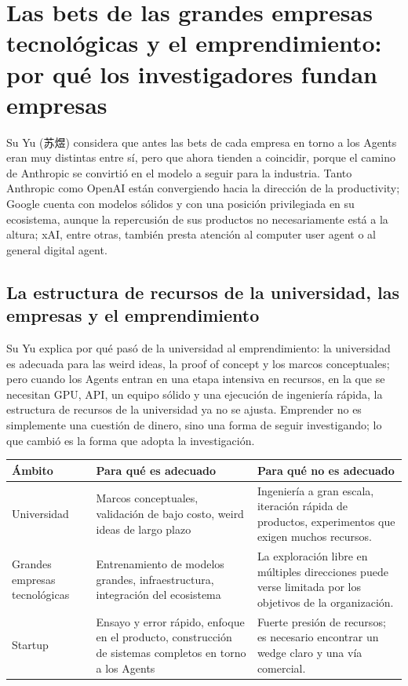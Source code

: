 \section{Las bets de las grandes empresas tecnológicas y el emprendimiento: por qué los investigadores fundan empresas}

Su Yu (苏煜) considera que antes las bets de cada empresa en torno a los Agents eran muy distintas entre sí, pero que ahora tienden a coincidir, porque el camino de Anthropic se convirtió en el modelo a seguir para la industria. Tanto Anthropic como OpenAI están convergiendo hacia la dirección de la productivity; Google cuenta con modelos sólidos y con una posición privilegiada en su ecosistema, aunque la repercusión de sus productos no necesariamente está a la altura; xAI, entre otras, también presta atención al computer user agent o al general digital agent.




\subsection{La estructura de recursos de la universidad, las empresas y el emprendimiento}

Su Yu explica por qué pasó de la universidad al emprendimiento: la universidad es adecuada para las weird ideas, la proof of concept y los marcos conceptuales; pero cuando los Agents entran en una etapa intensiva en recursos, en la que se necesitan GPU, API, un equipo sólido y una ejecución de ingeniería rápida, la estructura de recursos de la universidad ya no se ajusta. Emprender no es simplemente una cuestión de dinero, sino una forma de seguir investigando; lo que cambió es la forma que adopta la investigación.

\noindent\begin{tabularx}{\textwidth}{p{}p{}X}
\toprule
Ámbito & Para qué es adecuado & Para qué no es adecuado \\
\midrule
Universidad & Marcos conceptuales, validación de bajo costo, weird ideas de largo plazo & Ingeniería a gran escala, iteración rápida de productos, experimentos que exigen muchos recursos. \\
Grandes empresas tecnológicas & Entrenamiento de modelos grandes, infraestructura, integración del ecosistema & La exploración libre en múltiples direcciones puede verse limitada por los objetivos de la organización. \\
Startup & Ensayo y error rápido, enfoque en el producto, construcción de sistemas completos en torno a los Agents & Fuerte presión de recursos; es necesario encontrar un wedge claro y una vía comercial. \\
\bottomrule
\end{tabularx}

